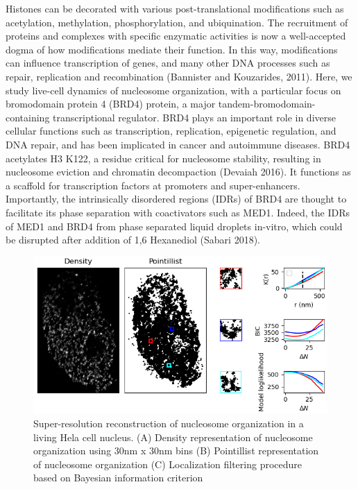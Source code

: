 \documentclass{ucetd}
\begin{document}
Histones can be decorated with various post-translational modifications such as acetylation, methylation, phosphorylation, and ubiquination. The recruitment of proteins and complexes with specific enzymatic activities is now a well-accepted dogma of how modifications mediate their function. In this way, modifications can influence transcription of genes, and many other DNA processes such as repair, replication and recombination (Bannister and Kouzarides, 2011). Here, we study live-cell dynamics of nucleosome organization, with a particular focus on bromodomain protein 4 (BRD4) protein, a major tandem-bromodomain-containing transcriptional regulator. BRD4 plays an important role in diverse cellular functions such as transcription, replication, epigenetic regulation, and DNA repair, and has been implicated in cancer and autoimmune diseases. BRD4 acetylates H3 K122, a residue critical for nucleosome stability, resulting in nucleosome eviction and chromatin decompaction (Devaiah 2016). It functions as a scaffold for transcription factors at promoters and super-enhancers. Importantly, the intrinsically disordered regions (IDRs) of BRD4 are thought to facilitate its phase separation with coactivators such as MED1. Indeed, the IDRs of MED1 and BRD4 from phase separated liquid droplets in-vitro, which could be disrupted after addition of 1,6 Hexanediol (Sabari 2018).  

\clearpage
\begin{figure}
\begin{center}
\includegraphics[width=16cm]{Cluster.png}
\end{center}
\caption{Super-resolution reconstruction of nucleosome organization in a living Hela cell nucleus. (A) Density representation of nucleosome organization using 30nm x 30nm bins (B) Pointillist representation of nucleosome organization (C) Localization filtering procedure based on Bayesian information criterion}
\end{figure}
\end{document}
